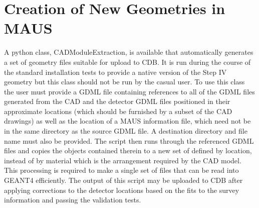 \section{Creation of New Geometries in MAUS}

A python class, CADModuleExtraction, is available that automatically
generates a set of geometry files suitable for upload to CDB. It is
run during the course of the standard installation tests to provide a
native version of the Step IV geometry but this class should not be
run by the casual user. To use this class the user must provide a GDML
file containing references to all of the GDML files generated from the
CAD and the detector GDML files positioned in their approximate
locations (which should be furnished by a subset of the CAD drawings)
as well as the location of a MAUS information file, which need not be
in the same directory as the source GDML file. A destination directory
and file name must also be provided. The script then runs through the
referenced GDML files and copies the objects contained therein to a
new set of defined by location, instead of by material which is the
arrangement required by the CAD model. This processing is required to
make a single set of files that can be read into GEANT4
efficiently. The output of this script may be uploaded to CDB after
applying corrections to the detector locations based on the fits to
the survey information and passing the validation tests.
